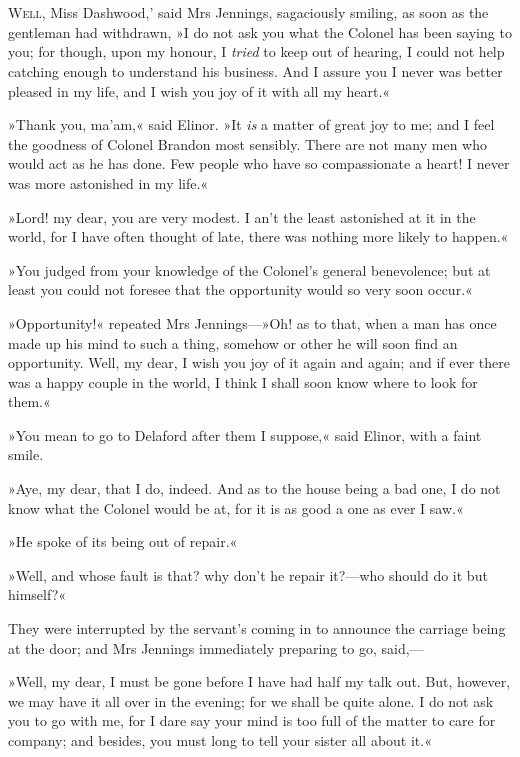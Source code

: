 \chapter[Chapter \thechapter]{}
\lettrine[ante=`,lines=4,lraise=0.3]{W}{ell,} Miss Dashwood,' said Mrs Jennings, sagaciously smiling, as soon as the gentleman had withdrawn, »I do not ask you what the Colonel has been saying to you; for though, upon my honour, I \textit{tried} to keep out of hearing, I could not help catching enough to understand his business. And I assure you I never was better pleased in my life, and I wish you joy of it with all my heart.«

»Thank you, ma’am,« said Elinor. »It \textit{is} a matter of great joy to me; and I feel the goodness of Colonel Brandon most sensibly. There are not many men who would act as he has done. Few people who have so compassionate a heart! I never was more astonished in my life.«

»Lord! my dear, you are very modest. I an’t the least astonished at it in the world, for I have often thought of late, there was nothing more likely to happen.«

»You judged from your knowledge of the Colonel’s general benevolence; but at least you could not foresee that the opportunity would so very soon occur.«

»Opportunity!« repeated Mrs Jennings—»Oh! as to that, when a man has once made up his mind to such a thing, somehow or other he will soon find an opportunity. Well, my dear, I wish you joy of it again and again; and if ever there was a happy couple in the world, I think I shall soon know where to look for them.«

»You mean to go to Delaford after them I suppose,« said Elinor, with a faint smile.

»Aye, my dear, that I do, indeed. And as to the house being a bad one, I do not know what the Colonel would be at, for it is as good a one as ever I saw.«

»He spoke of its being out of repair.«

»Well, and whose fault is that? why don’t he repair it?—who should do it but himself?«

They were interrupted by the servant’s coming in to announce the carriage being at the door; and Mrs Jennings immediately preparing to go, said,—

»Well, my dear, I must be gone before I have had half my talk out. But, however, we may have it all over in the evening; for we shall be quite alone. I do not ask you to go with me, for I dare say your mind is too full of the matter to care for company; and besides, you must long to tell your sister all about it.«

